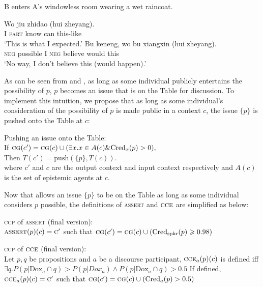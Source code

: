 \documentclass[output=paper,colorlinks,citecolor=brown]{langscibook}
\begin{document}
\ea\label{4.55wrrr} B enters A's windowless room wearing a  wet raincoat.
\begin{xlist}
 \gll Wo jiu zhidao (hui zheyang). \\
I \textsc{part} know can this-like\\
\glt `This is what I expected.'
 \gll Bu keneng, wo bu xiangxin (hui zheyang).\\
\textsc{neg} possible I \textsc{neg} believe would this \\
\glt `No way, I don't believe this (would happen).'
\end{xlist}
\z



As can be seen from  and ,   as long as some individual  publicly entertains the possibility of   $p$, $p$ becomes an issue that is  on the Table for discussion. To implement this intuition, we  propose that as long as
 some individual's  consideration of the possibility of $p$ is made public in a context ${c}$,  the issue $\{p\}$ is pushed onto the Table at  ${c}$:

      \ea \label{tablecg} Pushing an issue onto the Table:\\
      If $\textsc{cg}({c}') =\textsc{cg}({c}) \cup (\exists x.x\in A({c})\&\mathrm{Cred}_{x}(p) > 0),$\\ Then
 ${T}({c}') = \mathrm{push}(\{p\}, {T}({c}))$.\\ where ${c}'$ and ${c}$ are  the output context and  input context respectively and $A({c})$ is the set of epistemic agents at ${c}$.
\z

 Now that   allows an issue $\{p\}$ to be on the Table as long as   some individual   considers $p$ possible,  the definitions of  \textsc{assert} and $\textsc{cce}$ are simplified as below:


\ea\label{bf3r} \textsc{ccp} of \textsc{assert}  (final version):\\$\textsc{assert}(p)(c) = \textsc{c}'$ such that
$\textsc{cg}(c') = \textsc{cg}(c)  \cup (\mathrm{Cred}_\mathrm{spkr}(p) \geqslant 0.98)$
\z


\ea \label{Efrr} \textsc{ccp} of $\textsc{cce}$  (final version):\\ 
Let $p, q$ be  propositions  and $a$ be a discourse participant,
\ea $\textsc{cce}_a(p)({c})$ is defined iff $\exists q. P(p|\mathrm{Dox}_a\cap q) > P(p|Dox_a)\land P(p|\mathrm{Dox}_a\cap q)>0.5$
\ex If defined,
$\textsc{cce}_{a}(p)(c) = \textsc{c}'$ such that $\textsc{cg}(c') = \textsc{cg}(c) \cup (\mathrm{Cred}_{a}(p) > 0.5)$
\z
\z
\end{document}
